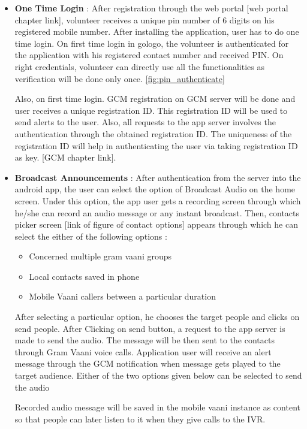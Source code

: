 \begin{itemize}
\item \textbf{One Time Login} : After registration through the web portal [web portal chapter link], volunteer receives a unique pin number of 6 digits on his registered mobile number. After installing the application, user has to do one time login. On first time login in gologo, the volunteer is authenticated for the application with his registered contact number and received PIN. On right credentials, volunteer can directly use all the functionalities as verification will be done only once. 
\ref{fig:pin_authenticate}

Also, on first time login. GCM registration on GCM server will be done and user receives a unique registration ID. This registration ID will be used to send alerts to the user. Also, all requests to the app server involves the authentication through the obtained registration ID. The uniqueness of the registration ID will help in authenticating the user via taking registration ID as key.  [GCM chapter link]. 

\item \textbf{Broadcast Announcements} : After authentication from the server into the android app, the user can select the option of Broadcast Audio on the home screen. Under this option, the app user gets a recording screen through which he/she can record an audio message or any instant broadcast. Then, contacts picker screen [link of figure of contact options] appears through which he can select the either of the following options :

\begin{itemize}
	\item Concerned multiple gram vaani groups 
	\item Local contacts saved in phone 
	\item Mobile Vaani callers between a  particular duration
\end{itemize}

After selecting a particular option, he chooses the target people and clicks on send people. After Clicking on send button, a request to the app server is made to send the audio. The message will be then sent to the contacts through Gram Vaani voice calls.  Application user will receive an alert  message through the GCM notification when message gets played to the target audience. Either of the two options given below can be selected to send the audio

Recorded audio message will be saved in the mobile vaani instance as content so that people can later listen to it when they give calls to the IVR.


\end{itemize}
